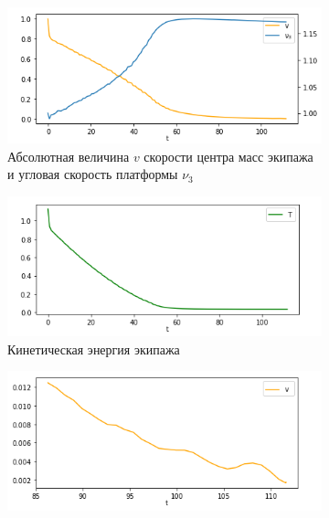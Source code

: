 \begin{figure}[htb]
    \centering
        \begin{subfigure}[t]{\textwidth}
            \centering
            \includegraphics[width=\linewidth]{content/pic/new/viscous/visc_3_100_vnu3.png}
            \vspace{-25pt}
            \caption{Абсолютная величина $v$ скорости центра масс экипажа и угловая скорость платформы $\nu_3$}
            \label{fig:visc_vnu3}
        \end{subfigure}
        \begin{subfigure}[t]{\textwidth}
            \vspace{15pt}
            \centering
            \includegraphics[width=\linewidth]{content/pic/new/viscous/visc_3_100_T.png}
            \vspace{-25pt}
            \caption{Кинетическая энергия экипажа}
            \label{fig:visc_T}
        \end{subfigure}
        \begin{subfigure}[t]{\textwidth}
            \vspace{15pt}
            \centering
            \includegraphics[width=\linewidth]{content/pic/new/viscous/visc_3_100_v_late.png}

\end{subfigure}
\end{figure}
